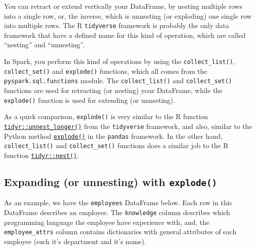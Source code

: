 \documentclass[
  11pt,
  letterpaper,
  DIV=11,
  numbers=noendperiod]{scrreprt}
\begin{document}
You can retract or extend vertically your DataFrame, by nesting multiple
rows into a single row, or, the inverse, which is unnesting (or
exploding) one single row into multiple rows. The R \texttt{tidyverse}
framework is probably the only data framework that have a defined name
for this kind of operation, which are called ``nesting'' and
``unnesting''.

In Spark, you perform this kind of operations by using the
\texttt{collect\_list()}, \texttt{collect\_set()} and \texttt{explode()}
functions, which all comes from the \texttt{pyspark.sql.functions}
module. The \texttt{collect\_list()} and \texttt{collect\_set()}
functions are used for retracting (or nesting) your DataFrame, while the
\texttt{explode()} function is used for extending (or unnesting).

As a quick comparison, \texttt{explode()} is very similar to the R
function
\href{https://tidyr.tidyverse.org/reference/unnest_longer.html}{\texttt{tidyr::unnest\_longer()}}
from the \texttt{tidyverse} framework, and also, similar to the Python
method
\href{https://pandas.pydata.org/docs/reference/api/pandas.DataFrame.explode.html}{\texttt{explode()}}
in the \texttt{pandas} framework. In the other hand,
\texttt{collect\_list()} and \texttt{collect\_set()} functions does a
similar job to the R function
\href{https://tidyr.tidyverse.org/reference/nest.html}{\texttt{tidyr::nest()}}.

\hypertarget{expanding-or-unnesting-with-explode}{%
\subsection{\texorpdfstring{Expanding (or unnesting) with
\texttt{explode()}}{Expanding (or unnesting) with explode()}}\label{expanding-or-unnesting-with-explode}}

As an example, we have the \texttt{employees} DataFrame below. Each row
in this DataFrame describes an employee. The \texttt{knowledge} column
describes which programming language the employee have experience with,
and, the \texttt{employee\_attrs} column contains dictionaries with
general attributes of each employee (such it's department and it's
name).
\end{document}
